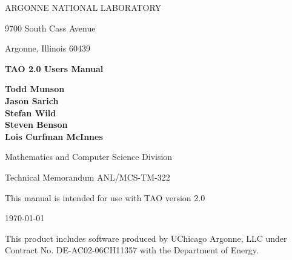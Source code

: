 
\vspace{1.75in}

\begin{center}

ARGONNE NATIONAL LABORATORY

9700 South Cass Avenue

Argonne, Illinois  60439

\vspace{1.5in}

{\Large
{\bf 
TAO 2.0 Users Manual
}
}

\vspace{.5in}

{\bf Todd Munson \\ Jason Sarich \\ Stefan Wild \\ Steven Benson \\ Lois Curfman McInnes}

\vspace{.5in}

Mathematics and Computer Science Division

\vspace{.25in}

Technical Memorandum ANL/MCS-TM-322

\vspace{.25in}

This manual is intended for use with TAO version 2.0

\vspace{1.0in}

\today
\end{center}

\vspace{0.75in}

\par\noindent
This product includes software produced by UChicago Argonne, LLC under 
Contract No. DE-AC02-06CH11357 with the Department of Energy.

